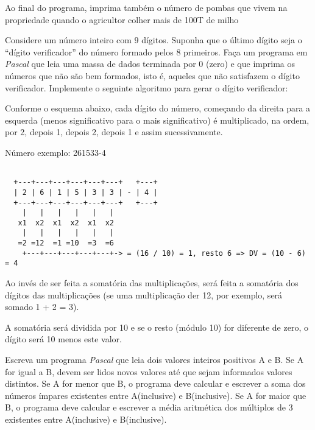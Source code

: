 Ao final do programa, imprima também o número de pombas que vivem na
propriedade quando o agricultor colher mais de 100T de milho

\item Considere um número inteiro com 9 dígitos. Suponha que o  último dígito seja o ``dígito verificador''
 do número formado pelos 8 primeiros. Faça um programa em \emph{Pascal} que leia uma massa de dados terminada por 0 (zero) e que
imprima os números que não são bem formados, isto é, aqueles que não satisfazem o dígito
verificador. Implemente o seguinte algoritmo para gerar o dígito verificador:

Conforme o esquema abaixo, cada dígito do número, começando da direita para a esquerda
(menos significativo para o mais significativo) é multiplicado, na ordem, por 2, depois 1,
depois 2, depois 1 e assim sucessivamente.

Número exemplo: 261533-4

\begin{center}
\begin{small}
\begin{verbatim}

  +---+---+---+---+---+---+   +---+
  | 2 | 6 | 1 | 5 | 3 | 3 | - | 4 |
  +---+---+---+---+---+---+   +---+
    |   |   |   |   |   |
   x1  x2  x1  x2  x1  x2
    |   |   |   |   |   |
   =2 =12  =1 =10  =3  =6
    +---+---+---+---+---+-> = (16 / 10) = 1, resto 6 => DV = (10 - 6) = 4 

\end{verbatim}
\end{small}
\end{center}

Ao invés de ser feita a somatória das multiplicações, será feita a somatória dos dígitos das multiplicações
(se uma multiplicação der 12, por exemplo, será somado 1 + 2 = 3).

A somatória será dividida por 10 e se o resto (módulo 10) for diferente de zero, o dígito será 10 menos este valor.

\item 
Escreva um programa \emph{Pascal} que leia dois valores inteiros positivos A e B.
Se A for igual a B, devem ser lidos novos valores até que sejam informados
valores distintos.  Se A for menor que B, o programa deve calcular e
escrever a soma dos números ímpares existentes entre A(inclusive) e
B(inclusive).  Se A for maior que B, o programa deve calcular e escrever a
média aritmética dos múltiplos de 3 existentes entre A(inclusive) e
B(inclusive).


